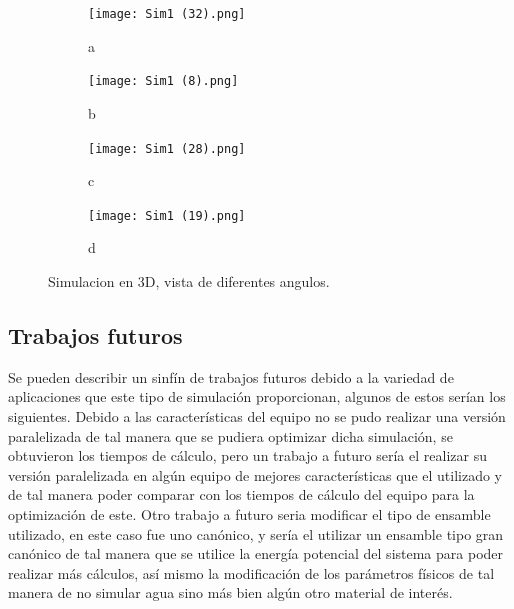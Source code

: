 \documentclass[3pt,twocolumn]{elsarticle}
\begin{document}
\begin{figure}[h!]
\centering
\begin{subfigure}[b]{0.45\linewidth}
\texttt{[image: Sim1 (32).png]}
\caption{a}
\label{f6.1}
\end{subfigure}
\begin{subfigure}[b]{0.45\linewidth}
\texttt{[image: Sim1 (8).png]}
\caption{b}
\label{f6.2}
\end{subfigure}
\begin{subfigure}[b]{0.45\linewidth}
\texttt{[image: Sim1 (28).png]}
\caption{c}
\label{f6.3}
\end{subfigure}
\begin{subfigure}[b]{0.45\linewidth}
\texttt{[image: Sim1 (19).png]}
\caption{d}
\label{f6.4}
\end{subfigure}
\caption{Simulacion en 3D, vista de diferentes angulos.}
\label{f6}
\end{figure}


\subsection{Trabajos futuros}
Se pueden describir un sinfín de trabajos futuros debido a la variedad de aplicaciones que este tipo de simulación proporcionan, algunos de estos serían los siguientes.
Debido a las características del equipo no se pudo realizar una versión paralelizada de tal manera que se pudiera optimizar dicha simulación, se obtuvieron los tiempos de cálculo, pero un trabajo a futuro sería el realizar su versión paralelizada en algún equipo de mejores características que el utilizado y de tal manera poder comparar con los tiempos de cálculo del equipo para la optimización de este.
Otro trabajo a futuro seria modificar el tipo de ensamble utilizado, en este caso fue uno canónico, y sería el utilizar un ensamble tipo gran canónico de tal manera que se utilice la energía potencial del sistema para poder realizar más cálculos, así mismo la modificación de los parámetros físicos de tal manera de no simular agua sino más bien algún otro material de interés.



\end{document}
